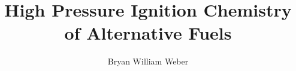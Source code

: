 \usepackage[capitalise, sort&compress, nameinlink]{cleveref}


\newcommand{\creflastconjunction}{, and~}
\newcommand{\crefrangeconjunction}{--}


\newcommand{\Autoref}[1]{%
  \begingroup%
  \def\chapterautorefname~##1\null{Chapter~##1\null}%
  \def\sectionautorefname~##1\null{Section~##1\null}%
  \def\subsectionautorefname~##1\null{Section~##1\null}%
  \def\subsubsectionautorefname~#1\null{Section~#1\null}
  \def\figureautorefname~##1\null{Figure~##1\null}%
  \def\tableautorefname~##1\null{Table~##1\null}%
  \def\equationautorefname~##1\null{Equation~##1\null}%
  \autoref{#1}%
  \endgroup%
}

\usepackage[margin=1in, letterpaper]{geometry}

\usepackage{fancyhdr}
\pagestyle{fancy}
\fancyhf{}
\fancyfoot[C]{\thepage}
\renewcommand{\headrulewidth}{0pt}

\usepackage{titling}
\title{High Pressure Ignition Chemistry of Alternative Fuels}
\author{Bryan William Weber}

\usepackage{tocbibind}
